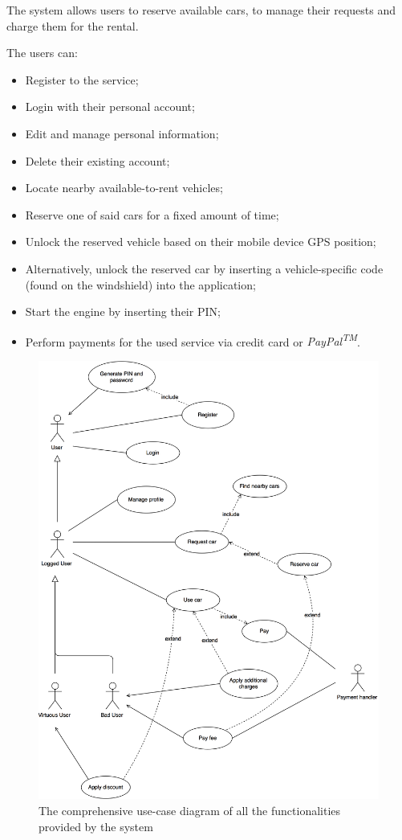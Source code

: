The system allows users to reserve available cars, to manage their requests and charge them for the rental.

The users can:
\begin{itemize}
\item Register to the service;
\item Login with their personal account;
\item Edit and manage personal information;
\item Delete their existing account;
\item Locate nearby available-to-rent vehicles;
\item Reserve one of said cars for a fixed amount of time;
\item Unlock the reserved vehicle based on their mobile device GPS position;
\item Alternatively, unlock the reserved car by inserting a vehicle-specific code (found on the windshield) into the application;
\item Start the engine by inserting their PIN;
\item Perform payments for the used service via credit card or \emph{PayPal\textsuperscript{TM}}.
\end{itemize}
\begin{figure}[!h]
	\centering
		\includegraphics[width=\textwidth]{./pictures/use_case.png}
		\caption{The comprehensive use-case diagram of all the functionalities provided by the 						system}
\end{figure}